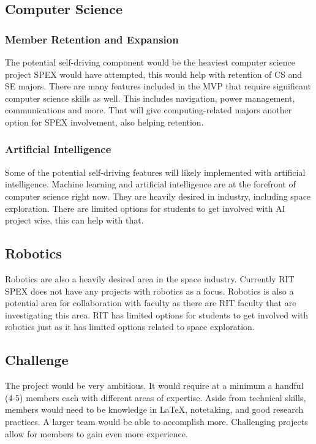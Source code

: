 \documentclass[conference]{IEEEtran} %
\begin{document}
\subsection{Computer Science}
\subsubsection{Member Retention and Expansion}
The potential self-driving component would be the heaviest computer science project SPEX would have attempted, this would help with retention of CS and SE majors. 
There are many features included in the MVP that require significant computer science skills as well.
This includes navigation, power management, communications and more.
That will give computing-related majors another option for SPEX involvement, also helping retention.

\subsubsection{Artificial Intelligence}
Some of the potential self-driving features will likely implemented with artificial intelligence.
Machine learning and artificial intelligence are at the forefront of computer science right now. 
They are heavily desired in industry, including space exploration.
There are limited options for students to get involved with AI project wise, this can help with that. 

\subsection{Robotics}
Robotics are also a heavily desired area in the space industry. 
Currently RIT SPEX does not have any projects with robotics as a focus. Robotics is also a potential area for collaboration with faculty as there are RIT faculty that are investigating this area.
RIT has limited options for students to get involved with robotics just as it has limited options related to space exploration. 

\subsection{Challenge}
The project would be very ambitious. 
It would require at a minimum a handful (4-5) members each with different areas of expertise. 
Aside from technical skills, members would need to be knowledge in \LaTeX{}, notetaking, and good research practices. 
A larger team would be able to accomplish more. 
Challenging projects allow for members to gain even more experience. 
\end{document}
